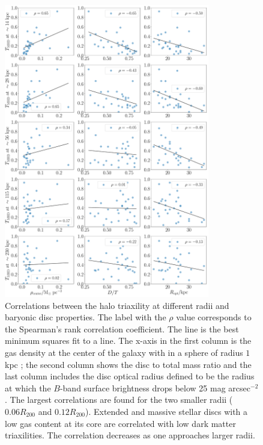 \documentclass[usenatbib]{mnras}
\begin{document}
\begin{figure}
\begin{center}
\includegraphics[width=0.8\textwidth]{correlation_T_MHD_disc.pdf}
\end{center}
\caption{Correlations between the halo triaxility at different radii
  and baryonic disc properties. 
  The label with the $\rho$ value corresponds to the Spearman's rank
  correlation coefficient.
  The line is the best minimum squares fit to a line.
  The x-axis in the first column is the gas density at the center of
  the galaxy with in a sphere of radius  $1$ kpc \citep{Pakmor17};
  the second column shows the disc to total mass ratio and the last
  column includes the disc optical radius defined to be the radius at which the
  $B$-band surface brightness drops below 25 mag arcsec$^{-2}$ \citep{auriga}.
  The largest correlations are found for the two smaller radii
  ($0.06R_{200}$ and $0.12R_{200}$).
  Extended and massive stellar discs with a low gas content at its
  core are correlated with low dark matter triaxilities.
  The correlation decreases as one approaches larger radii.}
\label{fig:disc_correlations}
\end{figure}
\end{document}
